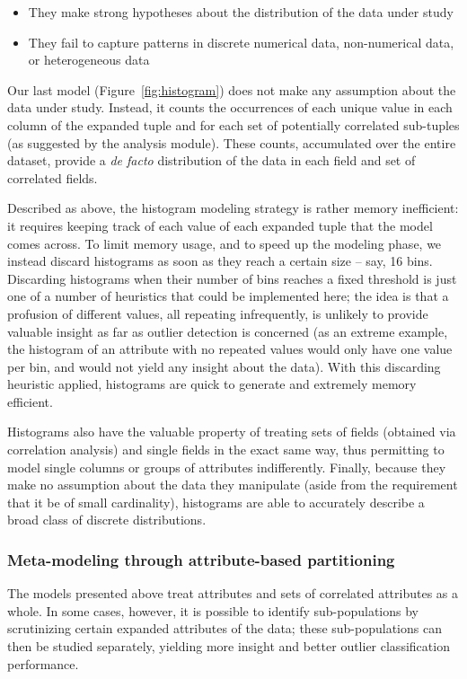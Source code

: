 \begin{itemize}
\item They make strong hypotheses about the distribution of the data under study
\item They fail to capture patterns in discrete numerical data, non-numerical data, or heterogeneous data
\end{itemize}

Our last model (Figure~\ref{fig:histogram}) does not make any assumption about the data under study. Instead, it counts the occurrences of each unique value in each column of the expanded tuple and for each set of potentially correlated sub-tuples (as suggested by the analysis module). These counts, accumulated over the entire dataset, provide a \emph{de facto} distribution of the data in each field and set of correlated fields.

Described as above, the histogram modeling strategy is rather memory inefficient: it requires keeping track of each value of each expanded tuple that the model comes across. To limit memory usage, and to speed up the modeling phase, we instead discard histograms as soon as they reach a certain size -- say, 16 bins. Discarding histograms when their number of bins reaches a fixed threshold is just one of a number of heuristics that could be implemented here; the idea is that a profusion of different values, all repeating infrequently, is unlikely to provide valuable insight as far as outlier detection is concerned (as an extreme example, the histogram of an attribute with no repeated values would only have one value per bin, and would not yield any insight about the data). With this discarding heuristic applied, histograms are quick to generate and extremely memory efficient.

Histograms also have the valuable property of treating sets of fields (obtained via correlation analysis) and single fields in the exact same way, thus permitting to model single columns or groups of attributes indifferently. Finally, because they make no assumption about the data they manipulate (aside from the requirement that it be of small cardinality), histograms are able to accurately describe a broad class of discrete distributions.

\subsubsection{Meta-modeling through attribute-based partitioning}
\label{sec:partitioning}

The models presented above treat attributes and sets of correlated attributes as a whole. In some cases, however, it is possible to identify sub-populations by scrutinizing certain expanded attributes of the data; these sub-populations can then be studied separately, yielding more insight and better outlier classification performance.

